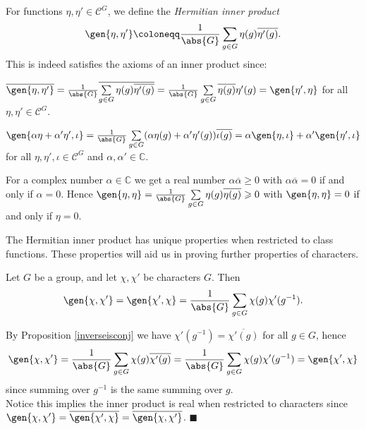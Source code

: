 \documentclass[../Project.tex]{subfiles}
\begin{document}
\begin{defi}
	For functions $\eta,\eta' \in \mathcal{C}^G$, we define the \textit{Hermitian inner product}
	$$\gen{\eta,\eta'} \coloneqq \frac{1}{\abs{G}}\sum_{g \in G} \eta(g)\overline{\eta'(g)}.$$
	This is indeed satisfies the axioms of an inner product since:
	\begin{mitem}
		\item $\overline{\gen{\eta,\eta'}} = \frac{1}{\abs{G}}\overline{\sum\limits_{g \in G} \eta(g)\overline{\eta'(g)}} =\frac{1}{\abs{G}}\sum\limits_{g \in G} \overline{\eta(g)}{\eta'(g)} = \gen{\eta',\eta}$ for all $\eta,\eta' \in \mathcal{C}^G$.
		\item $\gen{\alpha \eta+\alpha '\eta',\iota} = \frac{1}{\abs{G}}\sum\limits_{g \in G} (\alpha \eta(g) + \alpha'\eta'(g))\overline{\iota(g)} = \alpha\gen{\eta,\iota} + \alpha'\gen{\eta',\iota}$ for all $\eta,\eta',\iota \in \mathcal{C}^G$ and $\alpha,\alpha' \in \mathbb{C}$.
		\item For a complex number $\alpha \in \mathbb{C}$ we get a real number $\alpha\overline{\alpha} \geqslant 0$ with $\alpha\overline{\alpha} = 0$ if and only if $\alpha = 0$. Hence $\gen{\eta,\eta} = \frac{1}{\abs{G}}\sum\limits_{g \in G} \eta(g)\overline{\eta(g)} \geqslant 0$ with $\gen{\eta,\eta} = 0$ if and only if $\eta = 0$.
	\end{mitem}
\end{defi}

The Hermitian inner product has unique properties when restricted to class functions. These properties will aid us in proving further properties of characters.

\begin{prop}
	Let $G$ be a group, and let $\chi,\chi'$ be characters $G$. Then
	$$\gen{\chi,\chi'} = \gen{\chi',\chi} = \frac{1}{\abs{G}}\sum_{g \in G}\chi(g)\chi'(g^{-1}).$$
\end{prop}

\begin{proo*}[{\cite[Proposition 14.5 (1)]{2}}]
	By Proposition \ref{inverseisconj} we have $\chi'(g^{-1}) = \overline{\chi'(g)}$ for all $g \in G$, hence
	$$\gen{\chi,\chi'} = \frac{1}{\abs{G}}\sum_{g \in G}\chi(g)\overline{\chi'(g)} = \frac{1}{\abs{G}}\sum_{g \in G}\chi(g)\chi'(g^{-1}) =  \gen{\chi',\chi}$$
	since summing over $g^{-1}$ is the same summing over $g$.\\

	Notice this implies the inner product is real when restricted to characters since $\gen{\chi,\chi'} = \overline{\gen{\chi',\chi}} = \overline{\gen{\chi,\chi'}}$. \hfill$\blacksquare$\\
\end{proo*}
\end{document}
